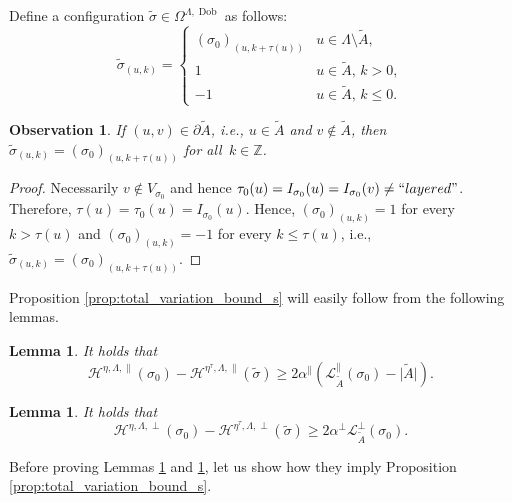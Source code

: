 \documentclass[11pt, reqno]{amsart}
\newtheorem{lemma}[theorem]{Lemma}
\newtheorem{obs}[theorem]{Observation}
\newcommand{\Z}{\mathbb{Z}}
\DeclareMathOperator{\Dob}{Dob}
\numberwithin{equation}{section}
\begin{document}
Define a configuration $\tilde{\sigma}\in\Omega^{\Lambda,\Dob}$ as follows:
$$
\tilde{\sigma}_{(u,k)}=\begin{cases}
(\sigma_0)_{\left(u,k+\tau(u)\right)} & u\in\Lambda\setminus\tilde{A},\\
1 & u\in \tilde{A},\, k>0,\\
-1 & u\in \tilde{A},\, k\leq 0.
\end{cases}
$$

\begin{obs}\label{obs:def_overlap}
If $(u,v)\in\partial\tilde{A}$, i.e., $u\in\tilde{A}$ and $v\notin\tilde{A}$, then  $\tilde{\sigma}_{(u,k)}=
(\sigma_0)_{\left(u,k+\tau(u)\right)}$ for all~$k\in\Z$.
\end{obs}

\begin{proof}
Necessarily $v\notin V_{\sigma_0}$ and hence ${\tau}_0(u)=I_{\sigma_0}(u)=I_{\sigma_0}(v)\neq{\rm ``layered"}$.
Therefore, ${\tau}(u)={\tau}_0(u)=I_{\sigma_0}(u)$. Hence, $(\sigma_0)_{(u,k)}=1$ for every $k>{\tau}(u)$ and $(\sigma_0)_{(u,k)}=-1$ for every $k\leq {\tau}(u)$, i.e., $\tilde{\sigma}_{(u,k)}=
(\sigma_0)_{\left(u,k+{\tau}(u)\right)}$.
\end{proof}

Proposition \ref{prop:total_variation_bound_s} will easily follow from the following lemmas.

\begin{lemma}\label{lem:horizontal}
It holds that
\begin{equation*}
\mathcal{H}^{\eta,\Lambda,\parallel}(\sigma_0)-\mathcal{H}^{\eta^{\tau},\Lambda,\parallel}(\tilde{\sigma})\geq 2\alpha^{\parallel} \left(\mathcal{L}_{\tilde{A}}^{\parallel}(\sigma_0)-\lvert\tilde{A}\rvert\right).
\end{equation*}
\end{lemma}

\begin{lemma}\label{lem:vertical}
It holds that
\begin{equation*}\mathcal{H}^{\eta,\Lambda,\perp}(\sigma_0)-
\mathcal{H}^{\eta^{\tau},\Lambda,\perp}(\tilde{\sigma}) \geq 2\alpha^{\perp}\mathcal{L}^{\perp}_{\tilde{A}}(\sigma_0).
\end{equation*}
\end{lemma}

Before proving Lemmas \ref{lem:horizontal} and \ref{lem:vertical}, let us show how they imply Proposition \ref{prop:total_variation_bound_s}.
\end{document}
